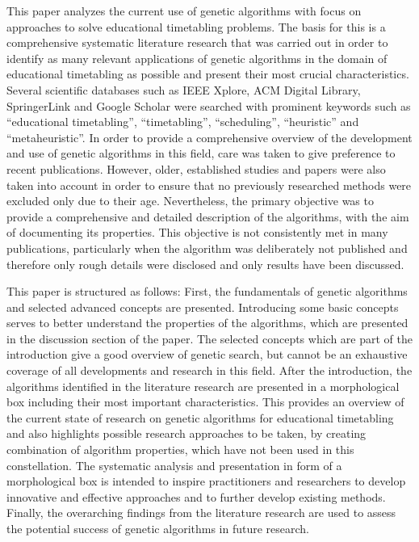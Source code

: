 \documentclass[sigconf]{acmart}
\begin{document}
This paper analyzes the current use of genetic algorithms with focus on
approaches to solve educational timetabling problems.
%
The basis for this is a comprehensive systematic literature research that
was carried out in order to identify as many relevant applications of genetic
algorithms in the domain of educational timetabling as possible and
present their most crucial characteristics.
%
Several scientific databases such as IEEE Xplore, ACM Digital Library,
SpringerLink and Google Scholar were searched with prominent keywords such as
\enquote{educational timetabling}, \enquote{timetabling}, \enquote{scheduling},
\enquote{heuristic} and \enquote{metaheuristic}.
%
In order to provide a comprehensive overview of the development and use of
genetic algorithms in this field, care was taken to give preference to recent
publications. However, older, established studies and papers were also taken
into account in order to ensure that no previously researched methods were
excluded only due to their age.
%
Nevertheless, the primary objective was to provide a comprehensive and detailed
description of the algorithms, with the aim of documenting its properties.
This objective is not consistently met in many publications, particularly
when the algorithm was deliberately not published and therefore only rough
details were disclosed and only results have been discussed.


This paper is structured as follows:
First, the fundamentals of genetic algorithms and selected advanced concepts
are presented. Introducing some basic concepts serves to better understand the
properties of the algorithms, which are presented in the discussion section
of the paper. The selected concepts which are part of the introduction give
a good overview of genetic search, but cannot be an exhaustive coverage of
all developments and research in this field.
%
After the introduction, the algorithms identified in the literature research
are presented in a morphological box including their most important
characteristics.
This provides an overview of the current state of research on genetic algorithms
for educational timetabling and also highlights possible research approaches
to be taken, by creating combination of algorithm properties, which have not
been used in this constellation.
The systematic analysis and presentation in form of a morphological box is
intended to inspire practitioners and researchers to develop innovative
and effective approaches and to further develop existing methods.
%
Finally, the overarching findings from the literature research are used to
assess the potential success of genetic algorithms in future research.
\end{document}
